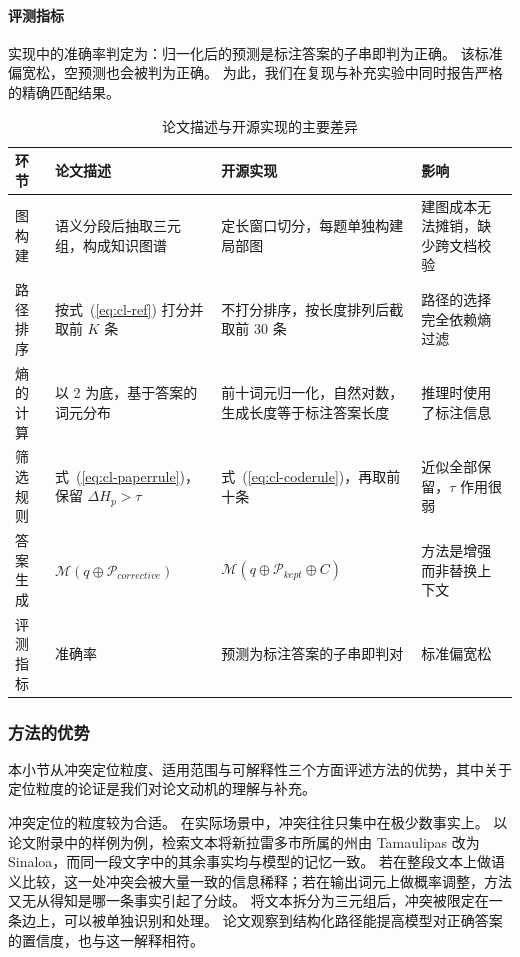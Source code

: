 \paragraph{评测指标}
实现中的准确率判定为：归一化后的预测是标注答案的子串即判为正确。
该标准偏宽松，空预测也会被判为正确。
为此，我们在复现与补充实验中同时报告严格的精确匹配结果。

\begin{table}[htbp]
  \centering
  \small
  \renewcommand{\arraystretch}{1.35}
  \caption{论文描述与开源实现的主要差异}
  \label{tab:cl-gap}
  \begin{tabular}{>{\raggedright\arraybackslash}p{1.7cm}
                  >{\raggedright\arraybackslash}p{3.6cm}
                  >{\raggedright\arraybackslash}p{5.0cm}
                  >{\raggedright\arraybackslash}p{4.2cm}}
    \toprule
    环节 & 论文描述 & 开源实现 & 影响 \\
    \midrule
    图构建   & 语义分段后抽取三元组，构成知识图谱 & 定长窗口切分，每题单独构建局部图 & 建图成本无法摊销，缺少跨文档校验 \\
    路径排序 & 按式~(\ref{eq:cl-ref}) 打分并取前 $K$ 条 & 不打分排序，按长度排列后截取前 30 条 & 路径的选择完全依赖熵过滤 \\
    熵的计算 & 以 2 为底，基于答案的词元分布 & 前十词元归一化，自然对数，生成长度等于标注答案长度 & 推理时使用了标注信息 \\
    筛选规则 & 式~(\ref{eq:cl-paperrule})，保留 $\Delta H_p>\tau$ & 式~(\ref{eq:cl-coderule})，再取前十条 & 近似全部保留，$\tau$ 作用很弱 \\
    答案生成 & $\mathcal{M}(q\oplus\mathcal{P}_{corrective})$ & $\mathcal{M}(q\oplus\mathcal{P}_{kept}\oplus C)$ & 方法是增强而非替换上下文 \\
    评测指标 & 准确率 & 预测为标注答案的子串即判对 & 标准偏宽松 \\
    \bottomrule
  \end{tabular}
\end{table}

\subsubsection{方法的优势}
\label{sec:cl-pros}

本小节从冲突定位粒度、适用范围与可解释性三个方面评述方法的优势，其中关于定位粒度的论证是我们对论文动机的理解与补充。

冲突定位的粒度较为合适。
在实际场景中，冲突往往只集中在极少数事实上。
以论文附录中的样例为例，检索文本将新拉雷多市所属的州由 Tamaulipas 改为 Sinaloa，而同一段文字中的其余事实均与模型的记忆一致。
若在整段文本上做语义比较，这一处冲突会被大量一致的信息稀释；若在输出词元上做概率调整，方法又无从得知是哪一条事实引起了分歧。
将文本拆分为三元组后，冲突被限定在一条边上，可以被单独识别和处理。
论文观察到结构化路径能提高模型对正确答案的置信度，也与这一解释相符。

